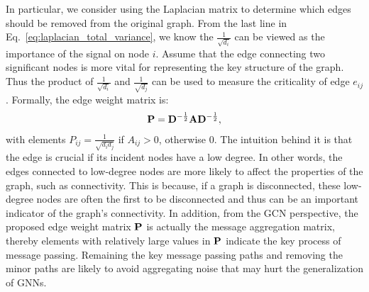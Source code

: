 In particular, we consider using the Laplacian matrix to determine which edges should be removed from the original graph. 
From  the last line
 in Eq.~\eqref{eq:laplacian_total_variance}, we know the $\frac{1}{\sqrt{d_i}}$ can be viewed as the importance of the signal on node $i$. Assume that the edge connecting two significant nodes is more vital for representing the key structure of the graph. Thus the product of $\frac{1}{\sqrt{d_i}}$ and $\frac{1}{\sqrt{d_j}}$ can be used to measure the criticality of edge $e_{ij}$. Formally, the edge weight matrix is:
 \begin{align}
     \mathbf{P}=\mathbf{D}^{-\frac{1}{2}}\mathbf{A}\mathbf{D}^{-\frac{1}{2}},
 \end{align}
 with elements $P_{ij} = \frac{1}{\sqrt{d_id_j}}$ if $A_{ij}>0$, otherwise $0$. The intuition behind it is that the edge is  crucial if its incident nodes have a low degree. In other words, the edges connected to low-degree nodes are more likely to affect the properties of the graph, such as connectivity. This is because, if a graph is disconnected, these low-degree nodes are often the first to be disconnected and thus can be an important indicator of the graph's connectivity.
 In addition, from the GCN perspective, the proposed edge weight matrix $\mathbf{P}$ is actually the message aggregation matrix, thereby elements with relatively large values  in $\mathbf{P}$  indicate the key process of message passing. Remaining the key message passing paths and removing the minor paths are likely to avoid aggregating noise that may hurt the generalization of GNNs. 


